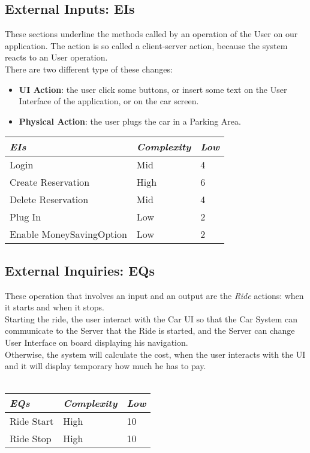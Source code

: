 \documentclass[11pt,a4paper]{report}
\begin{document}
\subsection{External Inputs: EIs}
These sections underline the methods called by an operation of the User on our application. The action is so called a client-server action, because the system reacts to an User operation.\\
There are two different type of these changes:
\begin{itemize}
	\item \textbf{UI Action}: the user click some buttons, or insert some text on the User Interface of the application, or on the car screen.
	\item \textbf{Physical Action}: the user plugs the car in a Parking Area.
\end{itemize}
\begin{tabularx}{\textwidth}{|X|X|X|}
	\hline
	\textit{EIs} & \textit{Complexity} & \textit{Low}\\
	\hline
	Login & Mid & 4\\
	Create Reservation & High & 6\\
	Delete Reservation & Mid & 4\\
	Plug In & Low & 2\\
	Enable MoneySavingOption & Low & 2\\
	\hline
\end{tabularx}
\subsection{External Inquiries: EQs}
These operation that involves an input and an output are the \textit{Ride} actions: when it starts and when it stops.\\
Starting the ride, the user interact with the Car UI so that the Car System can communicate to the Server that the Ride is started, and the Server can change User Interface on board displaying his navigation.\\
Otherwise, the system will calculate the cost, when the user interacts with the UI and it will display temporary how much he has to pay.\\\\
\begin{tabularx}{\textwidth}{|X|X|X|}
	\hline
	\textit{EQs} & \textit{Complexity} & \textit{Low}\\
	\hline
	Ride Start & High & 10\\
	Ride Stop & High & 10\\
	\hline
\end{tabularx}
\end{document}
